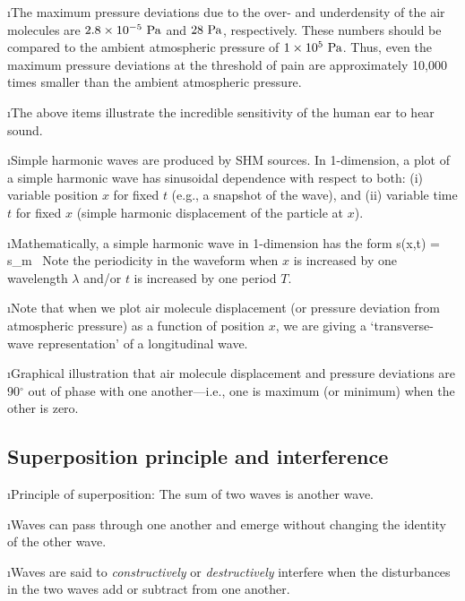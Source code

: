 \i The maximum pressure deviations due to the over- and 
underdensity of the air molecules are
$2.8\times 10^{-5}~{\rm Pa}$ and $28~{\rm Pa}$, respectively.
These numbers should be compared to the ambient atmospheric
pressure of $1\times 10^5~{\rm Pa}$.
Thus, even the maximum pressure deviations at the threshold 
of pain are approximately
10,000 times smaller than the ambient atmospheric pressure.

\i The above items illustrate the incredible sensitivity 
of the human ear to hear sound.

\i Simple harmonic waves are produced by SHM sources.
In 1-dimension, a plot of a simple harmonic wave has
sinusoidal dependence with respect to both:
(i) variable position $x$ for fixed $t$ (e.g., a snapshot of the wave), 
and
(ii) variable time $t$ for fixed $x$ (simple harmonic displacement of 
the particle at $x$).

\i Mathematically, a simple harmonic wave in 1-dimension
has the form
%
\be
s(x,t) = s_m \,\sin
{}
\ee
%
Note the periodicity in the waveform when $x$ is 
increased by one wavelength 
$\lambda$ and/or $t$ is increased by one period $T$.

\i Note that when we plot air molecule displacement 
(or pressure deviation from atmospheric pressure) 
as a function of position $x$, we are giving
a `transverse-wave representation' of a longitudinal
wave.

\i \demo Graphical illustration that air molecule displacement
and pressure deviations are 90$^\circ$ out of phase with 
one another---i.e., one is maximum (or minimum) 
when the other is zero.

\ei

\subsection{Superposition principle and interference}

\bi

\i Principle of superposition:
The sum of two waves is another wave.

\i Waves can pass through one another and emerge without
changing the identity of the other wave.

\i Waves are said to {\em constructively} or {\em destructively} 
interfere when the disturbances in the two waves add or subtract 
from one another.

